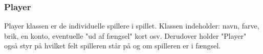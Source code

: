 \subsubsection{Player}
Player klassen er de individuelle spillere i spillet. Klassen indeholder: navn, farve, brik, en konto, eventuelle "ud af fængsel" kort osv. Derudover holder "Player" også styr på hvilket felt spilleren står på og om spilleren er i fængsel. 